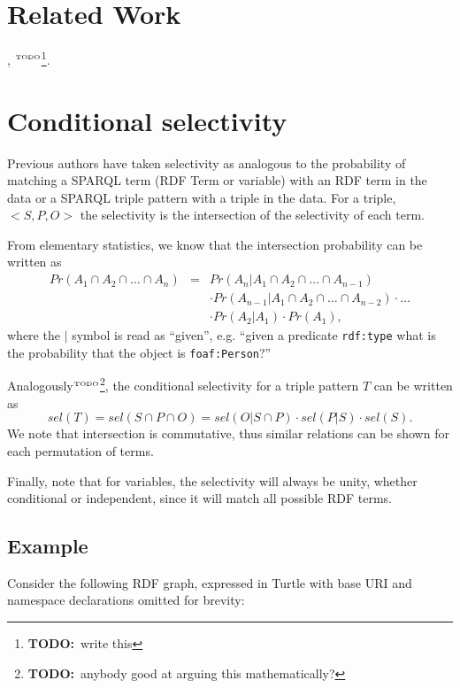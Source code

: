 \documentclass[12pt, draft]{article}
\newcommand{\rdfterm}[1]{\texttt{#1}}
\newcommand{\todo}[1]{\ensuremath{^{\textrm{\tiny{TODO}\normalsize}}}\footnote{\textbf{TODO:}~#1}}
\begin{document}
\section{Related Work}

\cite{splendid}, \cite{wodqa} \todo{write this}.

\section{Conditional selectivity}\label{sec:cond}

Previous authors have taken selectivity as analogous to the
probability of matching a SPARQL term (RDF Term or variable) with an
RDF term in the data or a SPARQL triple pattern with a triple in the
data.  For a triple, $<S, P, O>$ the selectivity is the intersection
of the selectivity of each term.

From elementary statistics, we know that the intersection probability
can be written as
\begin{eqnarray}
Pr(A_1 \cap A_2  \cap \ldots \cap A_n) &=& 
  Pr(A_n | A_1 \cap A_2  \cap \ldots \cap A_{n-1}) \nonumber\\
  &&\cdot Pr(A_{n-1} | A_1 \cap A_2  \cap \ldots \cap A_{n-2}) \cdot \ldots \nonumber\\
  && \cdot Pr(A_2 | A_1) \cdot Pr(A_1) ,
\end{eqnarray}
where the $|$ symbol is read as ``given'', e.g. ``given a predicate
\rdfterm{rdf:type} what is the probability that the object is \rdfterm{foaf:Person}?''

Analogously\todo{anybody good at arguing this mathematically?}, the
conditional selectivity for a triple pattern $T$ can be written as 
\begin{equation}\label{eq:sel}
sel(T) = sel(S \cap P \cap O) = sel(O | S \cap P) \cdot sel(P | S)
\cdot sel(S) . 
\end{equation}
We note that intersection is commutative, thus similar
relations can be shown for each permutation of terms.

Finally, note that for variables, the selectivity will always be
unity, whether conditional or independent, since it will match all
possible RDF terms.

\subsection{Example}\label{sec:example}

Consider the following RDF graph, expressed in Turtle with base URI
and namespace declarations omitted for brevity:
\end{document}
